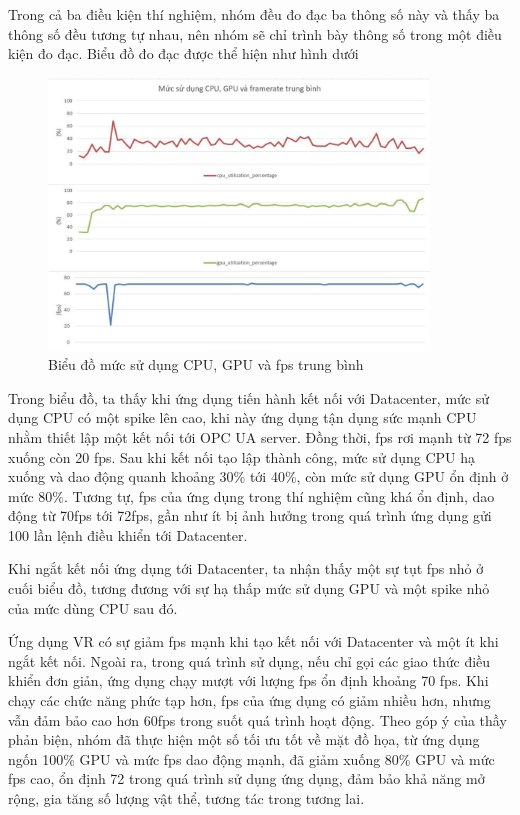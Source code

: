 Trong cả ba điều kiện thí nghiệm, nhóm đều đo đạc ba thông số này và thấy ba thông số đều tương tự nhau, nên nhóm sẽ chỉ trình bày thông số trong một điều kiện đo đạc. Biểu đồ đo đạc được thể hiện như hình dưới

\begin{figure}[H]
    \centering
    \includegraphics[width=0.9\textwidth]{Images/Result/VRapp_metrics.jpg}
    \caption{Biểu đồ mức sử dụng CPU, GPU và fps trung bình}
    \label{fig:VRapp_metrics}
\end{figure}

Trong biểu đồ, ta thấy khi ứng dụng tiến hành kết nối với Datacenter, mức sử dụng CPU có một spike lên cao, khi này ứng dụng tận dụng sức mạnh CPU nhằm thiết lập một kết nối tới OPC UA server. Đồng thời, fps rơi mạnh từ 72 fps xuống còn 20 fps. Sau khi kết nối tạo lập thành công, mức sử dụng CPU hạ xuống và dao động quanh khoảng 30\% tới 40\%, còn mức sử dụng GPU ổn định ở mức 80\%. Tương tự, fps của ứng dụng trong thí nghiệm cũng khá ổn định, dao động từ 70fps tới 72fps, gần như ít bị ảnh hưởng trong quá trình ứng dụng gửi 100 lần lệnh điều khiển tới Datacenter.

Khi ngắt kết nối ứng dụng tới Datacenter, ta nhận thấy một sự tụt fps nhỏ ở cuối biểu đồ, tương đương với sự hạ thấp mức sử dụng GPU và một spike nhỏ của mức dùng CPU sau đó.

Ứng dụng VR có sự giảm fps mạnh khi tạo kết nối với Datacenter và một ít khi ngắt kết nối. Ngoài ra, trong quá trình sử dụng, nếu chỉ gọi các giao thức điều khiển đơn giản, ứng dụng chạy mượt với lượng fps ổn định khoảng 70 fps. Khi chạy các chức năng phức tạp hơn, fps của ứng dụng có giảm nhiều hơn, nhưng vẫn đảm bảo cao hơn 60fps trong suốt quá trình hoạt động. Theo góp ý của thầy phản biện, nhóm đã thực hiện một số tối ưu tốt về mặt đồ họa, từ ứng dụng ngốn 100\% GPU và mức fps dao động mạnh, đã giảm xuống 80\% GPU và mức fps cao, ổn định 72 trong quá trình sử dụng ứng dụng, đảm bảo khả năng mở rộng, gia tăng số lượng vật thể, tương tác trong tương lai.

